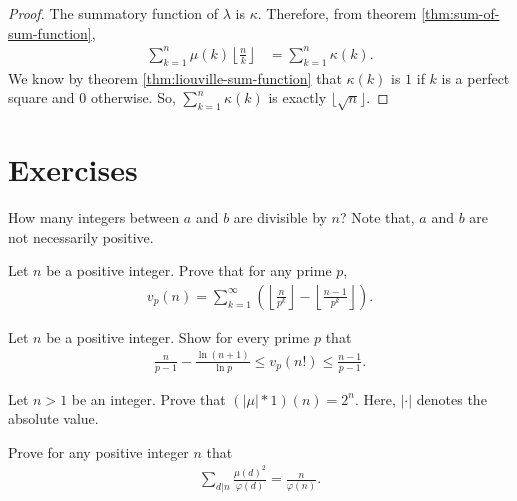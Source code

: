 \documentclass[12pt]{subfile}
\begin{document}
		\begin{proof}
			The summatory function of $\lambda$ is $\kappa$. Therefore, from theorem \ref{thm:sum-of-sum-function},
				\begin{align*}
					\sum_{k=1}^{n} \mu(k) \left\lfloor \frac{n}{k}\right\rfloor &= \sum_{k=1}^{n} \kappa(k).
				\end{align*}
			We know by theorem \ref{thm:liouville-sum-function} that $\kappa(k)$ is $1$ if $k$ is a perfect square and $0$ otherwise. So, $\sum\limits_{k=1}^{n} \kappa(k)$ is exactly $\lfloor \sqrt n \rfloor$.
		\end{proof}
\newpage
\section{Exercises}

	\begin{problem}
		How many integers between $a$ and $b$ are divisible by $n$? Note that, $a$ and $b$ are not necessarily positive.
	\end{problem}

	\begin{problem}
		Let $n$ be a positive integer. Prove that for any prime $p$,
			\begin{align*}
				v_p(n)= \sum_{k=1}^{\infty} \left(\left\lfloor \frac{n}{p^k}\right\rfloor - \left\lfloor \frac{n-1}{p^k}\right\rfloor\right).
			\end{align*}
	\end{problem}

	\begin{problem}%
		Let $n$ be a positive integer. Show for every prime $p$ that
			\begin{align*}
				\frac{n}{p-1} - \frac{\ln(n+1)}{\ln p} \leq v_p(n!) \leq \frac{n-1}{p-1}.
			\end{align*}
	\end{problem}

	\begin{problem}
		Let $n>1$ be an integer. Prove that $(|\mu|\ast 1)(n)=2^n$. Here, $|\cdot|$ denotes the absolute value.
	\end{problem}

	\begin{problem}
		Prove for any positive integer $n$ that
			\begin{align*}
				\sum_{d|n} \frac{\mu(d)^2}{\varphi(d)} = \frac{n}{\varphi(n)}.
			\end{align*}
	\end{problem}
\end{document}
